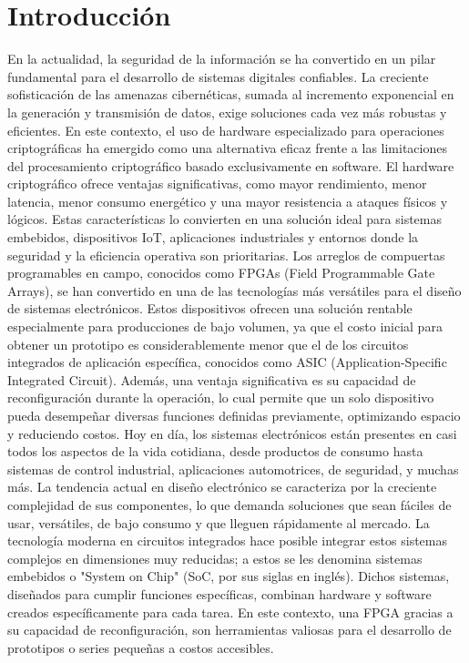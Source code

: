 
\chapter{Introducción} 
En la actualidad, la seguridad de la información se ha convertido en un pilar fundamental para el desarrollo de sistemas digitales confiables. La creciente sofisticación de las amenazas cibernéticas, sumada al incremento exponencial en la generación y transmisión de datos, exige soluciones cada vez más robustas y eficientes. En este contexto, el uso de hardware especializado para operaciones criptográficas ha emergido como una alternativa eficaz frente a las limitaciones del procesamiento criptográfico basado exclusivamente en software.
El hardware criptográfico ofrece ventajas significativas, como mayor rendimiento, menor latencia, menor consumo energético y una mayor resistencia a ataques físicos y lógicos. Estas características lo convierten en una solución ideal para sistemas embebidos, dispositivos IoT, aplicaciones industriales y entornos donde la seguridad y la eficiencia operativa son prioritarias.
Los arreglos de compuertas programables en campo, conocidos como FPGAs (Field Programmable Gate Arrays), se han convertido en una de las tecnologías más versátiles para el diseño de sistemas electrónicos. Estos dispositivos ofrecen una solución rentable especialmente para producciones de bajo volumen, ya que el costo inicial para obtener un prototipo es considerablemente menor que el de los circuitos integrados de aplicación específica, conocidos como ASIC (Application-Specific Integrated Circuit). Además, una ventaja significativa es su capacidad de reconfiguración durante la operación, lo cual permite que un solo dispositivo pueda desempeñar diversas funciones definidas previamente, optimizando espacio y reduciendo costos.
\clearpage
Hoy en día, los sistemas electrónicos están presentes en casi todos los aspectos de la vida cotidiana, desde productos de consumo hasta sistemas de control industrial, aplicaciones automotrices, de seguridad, y muchas más. La tendencia actual en diseño electrónico se caracteriza por la creciente complejidad de sus componentes, lo que demanda soluciones que sean fáciles de usar, versátiles, de bajo consumo y que lleguen rápidamente al mercado. La tecnología moderna en circuitos integrados hace posible integrar estos sistemas complejos en dimensiones muy reducidas; a estos se les denomina sistemas embebidos o "System on Chip" (SoC, por sus siglas en inglés). Dichos sistemas, diseñados para cumplir funciones específicas, combinan hardware y software creados específicamente para cada tarea. En este contexto, una FPGA gracias a su capacidad de reconfiguración, son herramientas valiosas para el desarrollo de prototipos o series pequeñas a costos accesibles.
